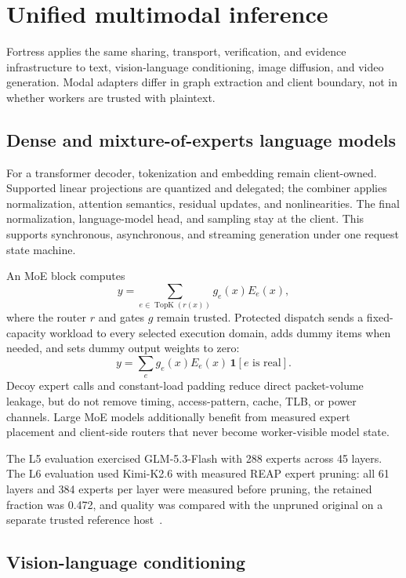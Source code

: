 \section{Unified multimodal inference}\label{sec:multimodal}

Fortress applies the same sharing, transport, verification, and evidence infrastructure to text, vision-language conditioning, image diffusion, and video generation. Modal adapters differ in graph extraction and client boundary, not in whether workers are trusted with plaintext.

\subsection{Dense and mixture-of-experts language models}

For a transformer decoder, tokenization and embedding remain client-owned. Supported linear projections are quantized and delegated; the combiner applies normalization, attention semantics, residual updates, and nonlinearities. The final normalization, language-model head, and sampling stay at the client. This supports synchronous, asynchronous, and streaming generation under one request state machine.

An MoE block computes
\begin{equation}
y=\sum_{e\in\operatorname{TopK}(r(x))}g_e(x)E_e(x),
\end{equation}
where the router $r$ and gates $g$ remain trusted. Protected dispatch sends a fixed-capacity workload to every selected execution domain, adds dummy items when needed, and sets dummy output weights to zero:
\begin{equation}
y=\sum_e g_e(x)E_e(x)\,\mathbf{1}[e\text{ is real}].
\end{equation}
Decoy expert calls and constant-load padding reduce direct packet-volume leakage, but do not remove timing, access-pattern, cache, TLB, or power channels. Large MoE models additionally benefit from measured expert placement and client-side routers that never become worker-visible model state.

The L5 evaluation exercised GLM-5.3-Flash with 288 experts across 45 layers. The L6 evaluation used Kimi-K2.6 with measured REAP expert pruning: all 61 layers and 384 experts per layer were measured before pruning, the retained fraction was 0.472, and quality was compared with the unpruned original on a separate trusted reference host~\cite{xurcroh-validation}.

\subsection{Vision-language conditioning}


